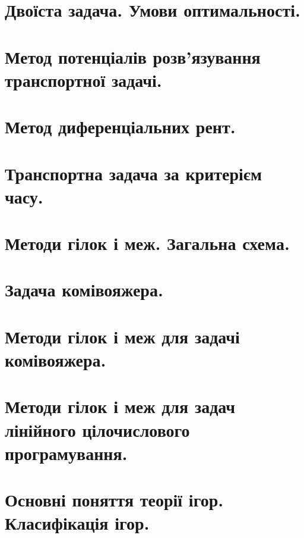 \documentclass[12pt,a4paper]{article}
\begin{document}
\clearpage

\section{Двоїста задача. Умови оптимальності.}

\clearpage

\section{Метод потенціалів розв'язування транспортної задачі.}

\clearpage

\section{Метод диференціальних рент.}

\clearpage

\section{Транспортна задача за критерієм часу.}

\clearpage

\section{Методи гілок і меж. Загальна схема.}

\clearpage

\section{Задача комівояжера.}

\clearpage

\section{Методи гілок і меж для задачі комівояжера.}

\clearpage

\section{Методи гілок і меж для задач лінійного цілочислового програмування.}

\clearpage

\section{Основні поняття теорії ігор. Класифікація ігор.}
\end{document}
